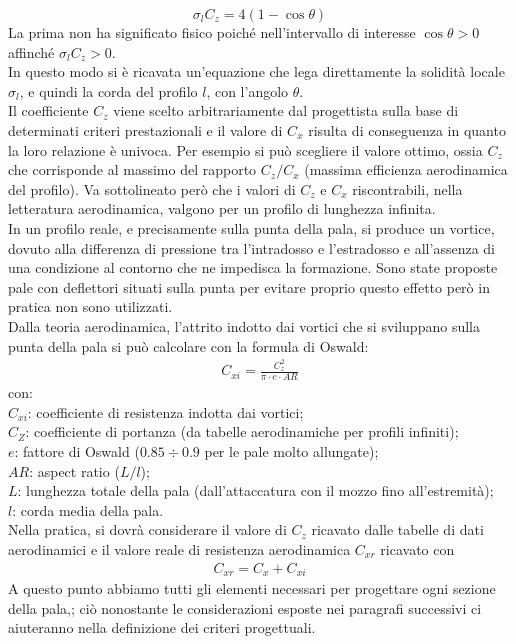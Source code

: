 \begin{equation}\label{eq:sigmazc}
\sigma_l C_z = 4 \left(1- \cos \theta \right)
\end{equation}
La prima non ha significato fisico poiché nell'intervallo di interesse $\cos \theta > 0 $ affinché $\sigma_l C_z > 0$.\\
In questo modo si è ricavata un'equazione che lega direttamente la solidità locale $\sigma_l$, e quindi la corda del profilo $l$, con l'angolo $\theta$.\\
Il coefficiente $C_z$ viene scelto arbitrariamente dal progettista sulla base di determinati criteri prestazionali e il valore di $C_x$ risulta di conseguenza in quanto la loro relazione è univoca. Per esempio si può scegliere il valore ottimo, ossia $C_z$ che corrisponde al massimo del rapporto $C_z/C_x$ (massima efficienza aerodinamica del profilo). Va sottolineato però che i valori di $C_z$ e $C_x$ riscontrabili, nella letteratura aerodinamica, valgono per un profilo di lunghezza infinita.\\
In un profilo reale, e precisamente sulla punta della pala, si produce un vortice, dovuto alla differenza di pressione tra l'intradosso e l'estradosso e all'assenza di una condizione al contorno che ne impedisca la formazione. Sono state proposte pale con deflettori situati sulla punta per evitare proprio questo effetto però in pratica non sono utilizzati.\\
Dalla teoria aerodinamica, l'attrito indotto dai vortici che si sviluppano sulla punta della pala si può calcolare con la formula di Oswald:
\begin{align*}
C_{xi} = \frac{C_z^2}{\pi \cdot e \cdot AR}
\end{align*}
con:\\[1mm]
$C_{xi}$: coefficiente di resistenza indotta dai vortici;\\
$C_Z$: coefficiente di portanza (da tabelle aerodinamiche per profili infiniti);\\
$e$: fattore di Oswald ($0.85 \div 0.9$ per le pale molto allungate);\\
$AR$: aspect ratio ($L/l$);\\
$L$: lunghezza totale della pala (dall'attaccatura con il mozzo fino all'estremità);\\
$l$: corda media della pala.\\[1mm]
Nella pratica, si dovrà considerare il valore di $C_z$ ricavato dalle tabelle di dati aerodinamici e il valore reale di resistenza aerodinamica $C_{xr}$ ricavato con
\begin{align*}
C_{xr} = C_x + C_{xi}
\end{align*}
A questo punto abbiamo tutti gli elementi necessari per progettare ogni sezione della pala,; ciò nonostante le considerazioni esposte nei paragrafi successivi ci aiuteranno nella definizione dei criteri progettuali.

